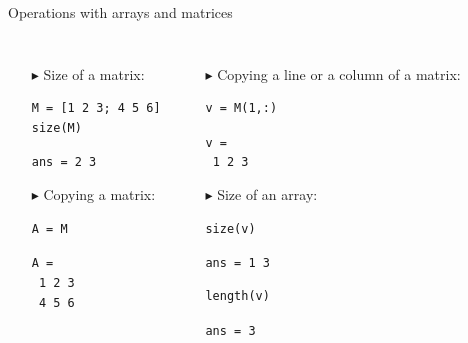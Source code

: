 \documentclass[aspectratio=169]{beamer}
\begin{document}
\begin{frame}[fragile]{Operations with arrays and matrices}
    \begin{columns}
    \begin{itemize}
        \vspace{-22pt}
        \item[$\blacktriangleright$]
        Size of a matrix:
        \begin{verbatim}
M = [1 2 3; 4 5 6]
size(M)
        \end{verbatim}
        \texttt{ans = 2 3}

        \item[$\blacktriangleright$]
        Copying a matrix:
        \begin{verbatim}
A = M
        \end{verbatim}
        \texttt{A =} \\
        \texttt{\hspace{3em} 1 \hspace{3em} 2 \hspace{3em} 3} \\
        \texttt{\hspace{3em} 4 \hspace{3em} 5 \hspace{3em} 6}
    \end{itemize}
    \begin{itemize}
        \vspace{-15pt}
        \item[$\blacktriangleright$]
        Copying a line or a column of a matrix:
        \begin{verbatim}
v = M(1,:)
        \end{verbatim}
        \texttt{v =} \\
        \texttt{\hspace{3em} 1 \hspace{3em} 2 \hspace{3em} 3}

        \item[$\blacktriangleright$]
        Size of an array:
        \begin{verbatim}
size(v)
        \end{verbatim}
        \texttt{ans = 1 3}

        \begin{verbatim}
length(v)
        \end{verbatim}
        \texttt{ans = 3}
    \end{itemize}
    \end{columns}
\end{frame}
 
\end{document}
